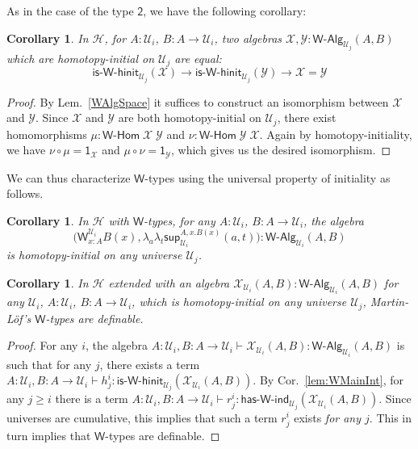 \documentclass[reqno,10pt,a4paper,oneside]{amsart}
\newcommand{\X}{\mathcal{X}}
\newcommand{\Y}{\mathcal{Y}}
\newcommand{\comp}{\circ}
\newcommand{\lam}[1]{\lambda_{#1}}
\newcommand{\W}{\mathsf{W}}
\newcommand{\wsup}{\mathsf{sup}}
\newcommand{\Bool}{\mathsf{2}}
\newcommand{\one}{\mathsf{1}}
\newcommand{\UU}{\mathcal{U}}
\newcommand{\WAlg}{\mathsf{W}\text{-}\mathsf{Alg}}
\newcommand{\WHom}{\mathsf{W}\text{-}\mathsf{Hom}}
\newcommand{\HasWInd}{\mathsf{has}\text{-}\mathsf{W}\text{-}\mathsf{ind}}
\newcommand{\IsWHInit}{\mathsf{is}\text{-}\mathsf{\W}\text{-}\mathsf{hinit}}
\newcommand{\Hint}{\mathcal{H}}
\numberwithin{equation}{section}
\theoremstyle{mythm}
\newtheorem{corollary}[theorem]{Corollary}
\theoremstyle{mydef}
\theoremstyle{myrmk}
\begin{document}
As in the case of the type $\Bool$, we have the following corollary:
\begin{corollary}\label{WHInitIso}
In $\Hint$, for $A:\UU_i$, $B : A \to \UU_i$, two algebras $\X,\Y : \WAlg_{\UU_j}(A,B)$ which are homotopy-initial on $\UU_j$ are equal:
\[ \IsWHInit_{\UU_j}(\X) \to \IsWHInit_{\UU_j}(\Y) \to \X = \Y\] 
\end{corollary}
\begin{proof}
By Lem.~\ref{WAlgSpace} it suffices to construct an isomorphism between $\X$ and $\Y$. Since $\X$ and $\Y$ are both homotopy-initial on $\UU_j$, there exist homomorphisms $\mu : \WHom \; \X \; \Y$ and $\nu : \WHom \; \Y \; \X$. Again by homotopy-initiality, we have $\nu \comp \mu = \one_\X$ and $\mu \comp \nu = \one_\Y$, which gives us the desired isomorphism.
\end{proof}

We can thus characterize $\W$-types using the universal property of initiality as follows.
\begin{corollary}\label{lem:WInitInt}
In $\Hint$ with $\W$-types, for any $A:\UU_i$, $B : A \to \UU_i$, the algebra \[\Big(\W^{\UU_i}_{x:A}B(x),\lam{a}\lam{t} \wsup_{\UU_i}^{A,x.B(x)}(a,t) \Big) : \WAlg_{\UU_i}(A,B)\] is homotopy-initial on any universe $\UU_j$.
\end{corollary}

\begin{corollary}\label{lem:WCharInt}
In $\Hint$ extended with an algebra $\X_{\UU_i}(A,B) : \WAlg_{\UU_i}(A,B)$ for any $\UU_i$, $A : \UU_i$, $B : A \to \UU_i$, which is homotopy-initial on any universe $\UU_j$, Martin-L{\"o}f's $\W$-types are definable.
\end{corollary}
\begin{proof}
For any $i$, the algebra $A:\UU_i,B:A\to \UU_i \vdash \X_{\UU_i}(A,B) : \WAlg_{\UU_i}(A,B)$ is such that for any $j$, there exists a term $A:\UU_i,B:A\to \UU_i \vdash h^i_j  : \IsWHInit_{\UU_j}(\X_{\UU_i}(A,B))$. By Cor.~\ref{lem:WMainInt}, for any $j \geq i$ there is a term $A:\UU_i,B:A\to \UU_i \vdash r^i_j : \HasWInd_{\UU_j}(\X_{\UU_i}(A,B))$. Since universes are cumulative, this implies that such a term $r^i_j$ exists \emph{for any $j$}. This in turn implies that $\W$-types are definable.
\end{proof}
\end{document}
